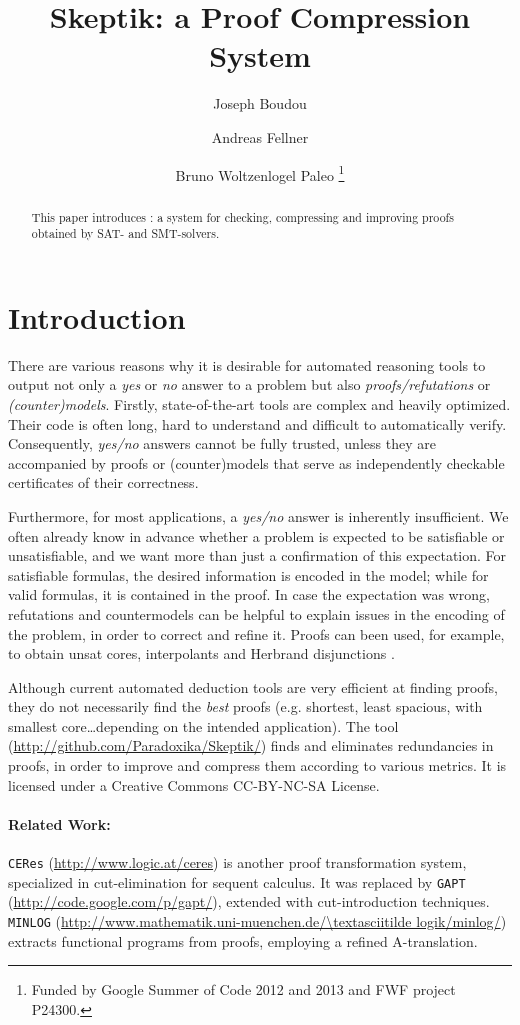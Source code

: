 \documentclass{llncs}
\title{ 
Skeptik: a Proof Compression System
}
\author{
  Joseph Boudou\inst{1}
  \and 
  Andreas Fellner\inst{2,3}
  \and 
  Bruno Woltzenlogel Paleo\inst{3}
  \thanks{Funded by Google Summer of Code 2012 and 2013 and FWF project P24300.}
}
\institute{
  IRIT, Universit\'e de Toulouse, France \\
  \email{joseph.boudou@irit.fr}
  \and 
  Free University of Bolzano, Italy \\
  \email{fellner.a@gmail.com}
  \and 
  Vienna University of Technology, Austria \\
  \email{bruno@logic.at}
}
\begin{document}
\maketitle


\begin{abstract}
This paper introduces \skeptik: a system for checking, compressing and improving proofs obtained by SAT- and SMT-solvers.
\end{abstract}

\setcounter{footnote}{0}


\section{Introduction}

There are various reasons why it is desirable 
for automated reasoning
tools to output not only a \emph{yes} or \emph{no} answer to a problem 
but also \emph{proofs/refutations} or \emph{(counter)models}. 
%
Firstly, state-of-the-art tools are complex and heavily optimized. Their code is often long, hard to understand and difficult to automatically verify. Consequently, \emph{yes/no} answers cannot be fully trusted, unless they are accompanied by proofs or (counter)models that serve as independently checkable certificates of 
their correctness. 

Furthermore, for most applications, a \emph{yes/no} answer is inherently insufficient. We often already know in advance whether a problem is expected to be satisfiable or unsatisfiable, and we want more than just a confirmation of this expectation. For satisfiable formulas, the desired information is encoded in the model; while for valid formulas, it is contained in the proof. In case the expectation was wrong, refutations and countermodels can be helpful to explain issues in the encoding of the problem, in order to correct and refine it. Proofs can been used, for example, to obtain unsat cores, interpolants and Herbrand disjunctions \cite{Paleo2008Herbrand}.

Although current automated deduction tools are very efficient at finding proofs, they do not necessarily find the \emph{best} proofs (e.g. shortest, least spacious, with smallest core\ldots depending on the intended application). The {\skeptik} tool (\url{http://github.com/Paradoxika/Skeptik/}) finds and eliminates redundancies in proofs, in order to improve and compress them according to various metrics. It is licensed under a Creative Commons CC-BY-NC-SA License.


\paragraph{Related Work:} \texttt{CERes} (\url{http://www.logic.at/ceres})
is another proof transformation system, specialized in cut-elimination for sequent calculus. It was replaced by \texttt{GAPT} (\url{http://code.google.com/p/gapt/}), 
extended with cut-introduction techniques.
\texttt{MINLOG} (\url{http://www.mathematik.uni-muenchen.de/\textasciitilde logik/minlog/}) 
extracts functional programs from proofs, employing a refined A-translation.
\end{document}
